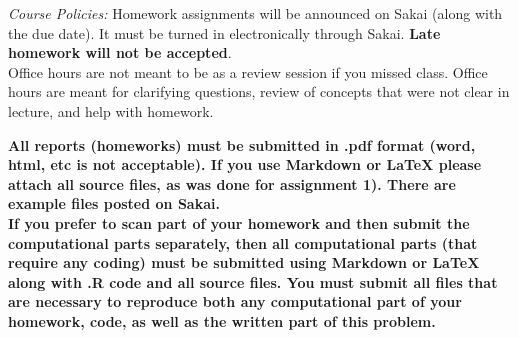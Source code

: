\documentclass[11pt]{article}
\begin{document}
%
%
%


\vspace{0.4cm}


\emph{Course Policies:} 
Homework assignments will be announced on Sakai (along with the due date). It must be turned in electronically through Sakai. \textbf{Late homework will not be accepted}.\\

Office hours are not meant to be as a review session if you missed class. Office hours are meant for clarifying questions, review of concepts that were not clear in lecture, and help with homework. \\

\newpage

\textbf{All reports (homeworks) must be submitted in .pdf format (word, html, etc is not acceptable). If you use Markdown or LaTeX please attach all source files, as was done for assignment 1). There are example files posted on Sakai.}\\

\textbf{If you prefer to scan part of your homework and then submit the computational parts separately, then all computational parts (that require any coding) must be submitted using Markdown or LaTeX along with .R code and all source files.  You must submit all files that are necessary to reproduce both any computational part of your homework, code, as well as the written part of this problem.}\\
\end{document}
